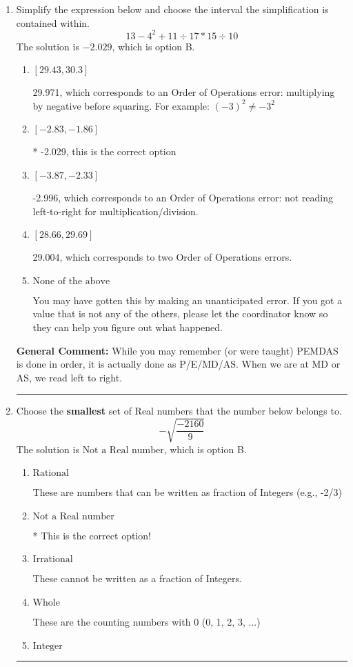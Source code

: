 \documentclass{extbook}[14pt]
\newcommand{\litem}[1]{\item #1

\rule{\textwidth}{0.4pt}}
\begin{document}
\begin{enumerate}\litem{
Simplify the expression below and choose the interval the simplification is contained within.
\[ 13 - 4^2 + 11 \div 17 * 15 \div 10 \]The solution is \( -2.029 \), which is option B.\begin{enumerate}[label=\Alph*.]
\item \( [29.43, 30.3] \)

 29.971, which corresponds to an Order of Operations error: multiplying by negative before squaring. For example: $(-3)^2 \neq -3^2$
\item \( [-2.83, -1.86] \)

* -2.029, this is the correct option
\item \( [-3.87, -2.33] \)

 -2.996, which corresponds to an Order of Operations error: not reading left-to-right for multiplication/division.
\item \( [28.66, 29.69] \)

 29.004, which corresponds to two Order of Operations errors.
\item \( \text{None of the above} \)

 You may have gotten this by making an unanticipated error. If you got a value that is not any of the others, please let the coordinator know so they can help you figure out what happened.
\end{enumerate}

\textbf{General Comment:} While you may remember (or were taught) PEMDAS is done in order, it is actually done as P/E/MD/AS. When we are at MD or AS, we read left to right.
}
\litem{
Choose the \textbf{smallest} set of Real numbers that the number below belongs to.
\[ -\sqrt{\frac{-2160}{9}} \]The solution is \( \text{Not a Real number} \), which is option B.\begin{enumerate}[label=\Alph*.]
\item \( \text{Rational} \)

These are numbers that can be written as fraction of Integers (e.g., -2/3)
\item \( \text{Not a Real number} \)

* This is the correct option!
\item \( \text{Irrational} \)

These cannot be written as a fraction of Integers.
\item \( \text{Whole} \)

These are the counting numbers with 0 (0, 1, 2, 3, ...)
\item \( \text{Integer} \)


\end{enumerate}}
\end{enumerate}
\end{document}

